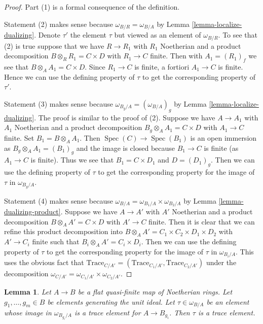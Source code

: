 \documentclass{stacks-project}
\theoremstyle{plain}
\newtheorem{lemma}[subsection]{Lemma}
\theoremstyle{definition}
\theoremstyle{remark}
\numberwithin{equation}{subsection}
\def\Spec{\mathop{\mathrm{Spec}}}
\begin{document}
\begin{proof}
Part (1) is a formal consequence of the definition.

\medskip\noindent
Statement (2) makes sense because $\omega_{B/R} = \omega_{B/A}$
by Lemma \ref{lemma-localize-dualizing}. Denote $\tau'$ the element
$\tau$ but viewed as an element of $\omega_{B/R}$. To see that (2) is true
suppose that we have $R \to R_1$ with $R_1$ Noetherian and a product
decomposition $B \otimes_R R_1 = C \times D$ with $R_1 \to C$ finite.
Then with $A_1 = (R_1)_f$ we see that $B \otimes_A A_1 = C \times D$.
Since $R_1 \to C$ is finite, a fortiori $A_1 \to C$ is finite.
Hence we can use the defining property of $\tau$ to get the corresponding
property of $\tau'$.

\medskip\noindent
Statement (3) makes sense because $\omega_{B_g/A} = (\omega_{B/A})_g$
by Lemma \ref{lemma-localize-dualizing}. The proof is similar to the proof
of (2). Suppose we have $A \to A_1$ with $A_1$ Noetherian and
a product decomposition $B_g \otimes_A A_1 = C \times D$ with $A_1 \to C$
finite. Set $B_1 = B \otimes_A A_1$. Then
$\Spec(C) \to \Spec(B_1)$ is an open immersion as $B_g \otimes_A A_1 = (B_1)_g$
and the image is closed because $B_1 \to C$ is finite
(as $A_1 \to C$ is finite).
Thus we see that $B_1 = C \times D_1$ and $D = (D_1)_g$. Then we can use
the defining property of $\tau$ to get the corresponding property
for the image of $\tau$ in $\omega_{B_g/A}$.

\medskip\noindent
Statement (4) makes sense because
$\omega_{B/A} = \omega_{B_1/A} \times \omega_{B_2/A}$ by
Lemma \ref{lemma-dualizing-product}.
Suppose we have $A \to A'$ with $A'$ Noetherian and
a product decomposition $B \otimes_A A' = C \times D$ with $A' \to C$
finite. Then it is clear that we can refine this product
decomposition into  $B \otimes_A A' = C_1 \times C_2 \times D_1 \times D_2$
with $A' \to C_i$ finite such that $B_i \otimes_A A' = C_i \times D_i$.
Then we can use the defining property of $\tau$ to get the corresponding
property for the image of $\tau$ in $\omega_{B_i/A}$. This uses the obvious
fact that
$\text{Trace}_{C/A'} = (\text{Trace}_{C_1/A'}, \text{Trace}_{C_2/A'})$
under the decomposition
$\omega_{C/A'} = \omega_{C_1/A'} \times \omega_{C_2/A'}$.
\end{proof}

\begin{lemma}
\label{lemma-glue-trace}
Let $A \to B$ be a flat quasi-finite map of Noetherian rings.
Let $g_1, \ldots, g_m \in B$ be elements generating the unit ideal.
Let $\tau \in \omega_{B/A}$ be an element whose image in
$\omega_{B_{g_i}/A}$ is a trace element for $A \to B_{g_i}$.
Then $\tau$ is a trace element.
\end{lemma}
\end{document}
